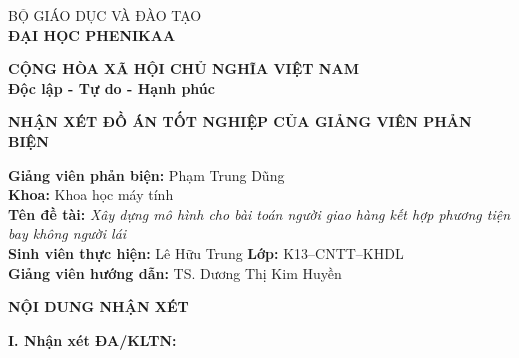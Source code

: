 \noindent
\begin{minipage}[t]{0.48\textwidth}
    \begin{center}
        BỘ GIÁO DỤC VÀ ĐÀO TẠO\\
        \textbf{ĐẠI HỌC PHENIKAA}
    \end{center}
\end{minipage}
\hfill
\begin{minipage}[t]{0.48\textwidth}
    \begin{center}
        {\fontsize{8pt}{11pt}\selectfont \textbf{CỘNG HÒA XÃ HỘI CHỦ NGHĨA VIỆT NAM}}\\
        \textbf{Độc lập - Tự do - Hạnh phúc}
    \end{center}
\end{minipage}

\vspace{0.5cm}

\begin{center}
    \textbf{\Large NHẬN XÉT ĐỒ ÁN TỐT NGHIỆP CỦA GIẢNG VIÊN PHẢN BIỆN}
\end{center}

\vspace{0.5cm}

\noindent
\textbf{Giảng viên phản biện:} Phạm Trung Dũng\\
\textbf{Khoa:} Khoa học máy tính\\
\textbf{Tên đề tài:} \textit{Xây dựng mô hình cho bài toán người giao hàng kết hợp phương tiện bay không người lái}\\
\textbf{Sinh viên thực hiện:} Lê Hữu Trung \hfill \textbf{Lớp:} K13--CNTT--KHDL\\
\textbf{Giảng viên hướng dẫn:} TS. Dương Thị Kim Huyền

\vspace{0.3cm}

\begin{center}
    \textbf{NỘI DUNG NHẬN XÉT}
\end{center}

\vspace{0.3cm}
\noindent\textbf{I. Nhận xét ĐA/KLTN:}


